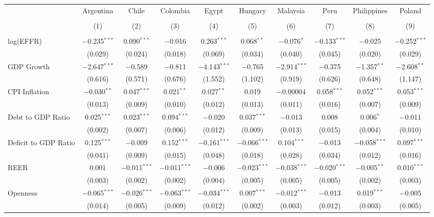 \documentclass[12pt]{article}
\begin{document}
\begin{landscape}
\begin{table}[!htbp]
\begin{tabular}{@{\extracolsep{5pt}}lccccccccc}
 & Argentina & Chile & Colombia & Egypt & Hungary & Malaysia & Peru & Philippines & Poland \\ 
\\[-1.8ex] & (1) & (2) & (3) & (4) & (5) & (6) & (7) & (8) & (9)\\ 
\hline \\[-1.8ex] 
 log(EFFR) & $-$0.235$^{***}$ & 0.090$^{***}$ & $-$0.016 & 0.263$^{***}$ & 0.068$^{**}$ & $-$0.076$^{*}$ & $-$0.133$^{***}$ & $-$0.025 & $-$0.252$^{***}$ \\ 
  & (0.029) & (0.024) & (0.018) & (0.069) & (0.034) & (0.040) & (0.045) & (0.020) & (0.029) \\ 
  GDP Growth & $-$2.647$^{***}$ & $-$0.589 & $-$0.811 & $-$4.143$^{***}$ & $-$0.765 & $-$2.914$^{***}$ & $-$0.375 & $-$1.357$^{**}$ & $-$2.608$^{**}$ \\ 
  & (0.616) & (0.571) & (0.676) & (1.552) & (1.102) & (0.919) & (0.626) & (0.648) & (1.147) \\ 
  CPI Inflation & $-$0.030$^{**}$ & 0.047$^{***}$ & 0.021$^{**}$ & 0.027$^{**}$ & 0.019 & $-$0.00004 & 0.058$^{***}$ & 0.052$^{***}$ & 0.053$^{***}$ \\ 
  & (0.013) & (0.009) & (0.010) & (0.012) & (0.013) & (0.011) & (0.016) & (0.007) & (0.009) \\ 
  Debt to GDP Ratio & 0.025$^{***}$ & 0.023$^{***}$ & 0.094$^{***}$ & $-$0.020 & 0.037$^{***}$ & $-$0.013 & 0.008 & 0.006$^{*}$ & $-$0.011 \\ 
  & (0.002) & (0.007) & (0.006) & (0.012) & (0.009) & (0.013) & (0.015) & (0.004) & (0.010) \\ 
  Deficit to GDP Ratio & 0.125$^{***}$ & $-$0.009 & 0.152$^{***}$ & $-$0.161$^{***}$ & $-$0.066$^{***}$ & 0.104$^{***}$ & $-$0.013 & $-$0.058$^{***}$ & 0.097$^{***}$ \\ 
  & (0.041) & (0.009) & (0.015) & (0.048) & (0.018) & (0.028) & (0.034) & (0.012) & (0.016) \\ 
  REER & 0.001 & $-$0.011$^{***}$ & $-$0.011$^{***}$ & $-$0.006 & $-$0.023$^{***}$ & $-$0.038$^{***}$ & $-$0.020$^{***}$ & $-$0.005$^{**}$ & 0.010$^{***}$ \\ 
  & (0.003) & (0.002) & (0.002) & (0.004) & (0.005) & (0.005) & (0.005) & (0.002) & (0.003) \\ 
  Openness & $-$0.065$^{***}$ & $-$0.026$^{***}$ & $-$0.063$^{***}$ & $-$0.034$^{***}$ & 0.007$^{***}$ & $-$0.012$^{***}$ & $-$0.013 & 0.019$^{***}$ & $-$0.005 \\ 
  & (0.014) & (0.005) & (0.009) & (0.012) & (0.002) & (0.003) & (0.012) & (0.003) & (0.005) \\ 

\end{tabular}
\end{table}
\end{landscape}
\end{document}
